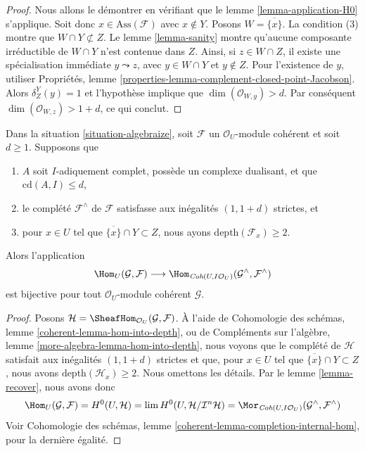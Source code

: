 \begin{proof}
Nous allons le démontrer en vérifiant que le lemme \ref{lemma-application-H0} s'applique.
Soit donc $x \in \text{Ass}(\mathcal{F})$ avec $x \not \in Y$.
Posons $W = \overline{\{x\}}$.
La condition (3) montre que $W \cap Y \not \subset Z$.
Le lemme \ref{lemma-sanity} montre qu'aucune composante
irréductible de $W \cap Y$ n'est contenue dans $Z$.
Ainsi, si $z \in W \cap Z$, il existe une
spécialisation immédiate $y \leadsto z$, avec $y \in W \cap Y$ et $y \not \in Z$.
Pour l'existence de $y$, utiliser
Propriétés, lemme \ref{properties-lemma-complement-closed-point-Jacobson}.
Alors $\delta^Y_Z(y) = 1$ et l'hypothèse
implique que $\dim(\mathcal{O}_{W, y}) > d$.
Par conséquent $\dim(\mathcal{O}_{W, z}) > 1 + d$, ce qui conclut.
\end{proof}

\begin{lemma}
\label{lemma-fully-faithful-inequalities}
Dans la situation \ref{situation-algebraize}, soit $\mathcal{F}$ un
$\mathcal{O}_U$-module cohérent et soit $d \geq 1$. Supposons que
\begin{enumerate}
\item $A$ soit $I$-adiquement complet, possède un complexe dualisant, et que
$\text{cd}(A, I) \leq d$,
\item le complété $\mathcal{F}^\wedge$ de $\mathcal{F}$
satisfasse aux inégalités $(1, 1 + d)$ strictes, et
\item pour $x \in U$ tel que $\overline{\{x\}} \cap Y \subset Z$,
nous ayons $\text{depth}(\mathcal{F}_x) \geq 2$.
\end{enumerate}
Alors l'application
$$
\Hom_U(\mathcal{G}, \mathcal{F})
\longrightarrow
\Hom_{\textit{Coh}(U, I\mathcal{O}_U)}(\mathcal{G}^\wedge, \mathcal{F}^\wedge)
$$
est bijective pour tout $\mathcal{O}_U$-module cohérent $\mathcal{G}$. 
\end{lemma}

\begin{proof}
Posons $\mathcal{H} = \SheafHom_{\mathcal{O}_U}(\mathcal{G}, \mathcal{F})$.
À l'aide de Cohomologie des schémas, lemme
\ref{coherent-lemma-hom-into-depth}, ou de
Compléments sur l'algèbre, lemme \ref{more-algebra-lemma-hom-into-depth},
nous voyons que le complété de $\mathcal{H}$
satisfait aux inégalités $(1, 1 + d)$ strictes et que, pour
$x \in U$ tel que $\overline{\{x\}} \cap Y \subset Z$,
nous avons $\text{depth}(\mathcal{H}_x) \geq 2$. Nous omettons les détails.
Par le lemme \ref{lemma-recover}, nous avons donc
$$
\Hom_U(\mathcal{G}, \mathcal{F}) =
H^0(U, \mathcal{H}) =
\lim H^0(U, \mathcal{H}/\mathcal{I}^n\mathcal{H}) =
\Mor_{\textit{Coh}(U, I\mathcal{O}_U)}
(\mathcal{G}^\wedge, \mathcal{F}^\wedge)
$$
Voir Cohomologie des schémas, lemme \ref{coherent-lemma-completion-internal-hom},
pour la dernière égalité.
\end{proof}

